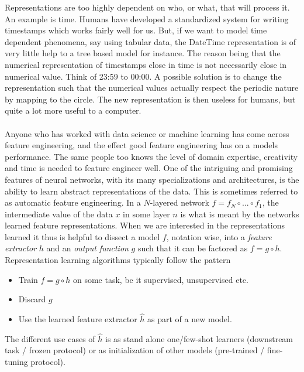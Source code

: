 \documentclass[../../thesis.tex]{subfiles}
\begin{document}
Representations are too highly dependent on who, or what, that will process it. An example is time. Humans have developed a standardized system for writing timestamps which works fairly well for us. But, if we want to model time dependent phenomena, say using tabular data, the DateTime representation is of very little help to a tree based model for instance. The reason being that the numerical representation of timestamps close in time is not necessarily close in numerical value. Think of 23:59 to 00:00. A possible solution is to change the representation such that the numerical values actually respect the periodic nature by mapping to the circle. The new representation is then useless for humans, but quite a lot more useful to a computer. \\\\

Anyone who has worked with data science or machine learning has come across feature engineering, and the effect good feature engineering has on a models performance. The same people too knows the level of domain expertise, creativity and time is needed to feature engineer well. One of the intriguing and promising features of neural networks, with its many specializations and architectures, is the ability to learn abstract representations of the data. This is sometimes referred to as automatic feature engineering.  In a $N$-layered network $f = f_N\circ ...\circ f_1$, the intermediate value of the data $x$ in some layer $n$ is what is meant by the networks learned feature representations. When we are interested in the representations learned it thus is helpful to dissect a model $f$, notation wise, into a \textit{feature extractor} $h$ and an \textit{output function}  $g$ such that it can be factored as $f = g \circ h$. Representation learning algorithms typically follow the pattern
\begin{itemize}
    \item Train $f= g \circ h$ on some task, be it supervised, unsupervised etc.
    \item Discard $g$
    \item Use the learned feature extractor $\widehat{h}$ as part of a new model. 
\end{itemize}


The different use cases of $\widehat{h}$ is as stand alone one/few-shot learners (downstream task / frozen protocol) or as initialization of other models (pre-trained / fine-tuning protocol). \newline
\end{document}
